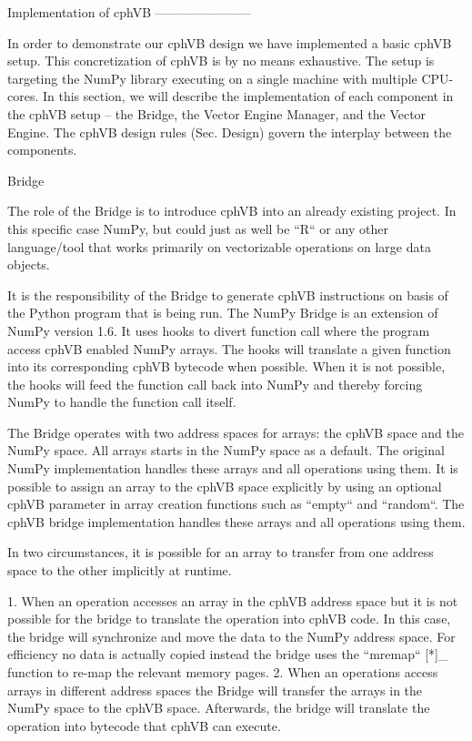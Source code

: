 
Implementation of cphVB
-----------------------

In order to demonstrate our cphVB design we have implemented a basic cphVB setup. This concretization of cphVB is by no means exhaustive. The setup is targeting the NumPy library executing on a single machine with multiple CPU-cores. In this section, we will describe the implementation of each component in the cphVB setup – the Bridge, the Vector Engine Manager, and the Vector Engine. The cphVB design rules (Sec. Design) govern the interplay between the components.

Bridge
~~~~~~

The role of the Bridge is to introduce cphVB into an already existing project. In this specific case NumPy, but could just as well be ``R`` or any other language/tool that works primarily on vectorizable operations on large data objects. 

It is the responsibility of the Bridge to generate cphVB instructions on basis of the Python program that is being run. The NumPy Bridge is an extension of NumPy version 1.6. It uses hooks to divert function call where the program access cphVB enabled NumPy arrays. The hooks will translate a given function into its corresponding cphVB bytecode when possible. When it is not possible, the hooks will feed the function call back into NumPy and thereby forcing NumPy to handle the function call itself.

The Bridge operates with two address spaces for arrays: the cphVB space and the NumPy space. All arrays starts in the NumPy space as a default. The original NumPy implementation handles these arrays and all operations using them. It is possible to assign an array to the cphVB space explicitly by using an optional cphVB parameter in array creation functions such as ``empty`` and ``random``. The cphVB bridge implementation handles these arrays and all operations using them. 

In two circumstances, it is possible for an array to transfer from one address space to the other implicitly at runtime. 

 1. When an operation accesses an array in the cphVB address space but it is not possible for the bridge to translate the operation into cphVB code. In this case, the bridge will synchronize and move the data to the NumPy address space. For efficiency no data is actually copied instead the bridge uses the ``mremap`` [*]_ function to re-map the relevant memory pages. 
 2. When an operations access arrays in different address spaces the Bridge will transfer the arrays in the NumPy space to the cphVB space. Afterwards, the bridge will translate the operation into bytecode that cphVB can execute.

